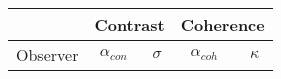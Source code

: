 \begin{table}[]
\centering
\scriptsize
\begin{tabular}{|c|c|c|c|c|}
\hline
 & \multicolumn{2}{c|}{Contrast}                                                                                                                         & \multicolumn{2}{c|}{Coherence}                                                                                                                           \\
\hline
Observer & $\alpha_{con}$                                                            & $\sigma$                                                                  & $\alpha_{coh}$                                                               & $\kappa$                                                                  \\ \hline


\end{tabular}
\end{table}
